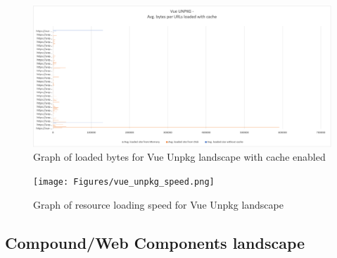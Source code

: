 \newpage
\begin{figure}[!h]
	\centering
	\includegraphics[width=1.4\textwidth, angle=90]{Figures/vue_unpkg_bytes_cache.png}
	\caption{Graph of loaded bytes for Vue Unpkg landscape with cache enabled}
	\label{fig:appendix_1_19}
\end{figure}
\newpage
\begin{figure}[!h]
	\centering
	\texttt{[image: Figures/vue\_unpkg\_speed.png]}
	\caption{Graph of resource loading speed for Vue Unpkg landscape}
	\label{fig:appendix_1_20}
\end{figure}
\newpage

\subsection{Compound/Web Components landscape}

